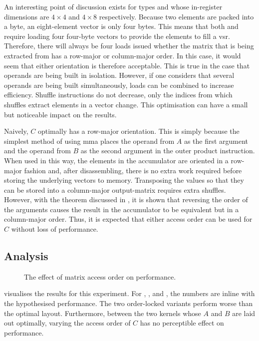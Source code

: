 \documentclass[\main/thesis.tex]{subfiles}
\begin{document}
An interesting point of discussion exists for types  and  whose in-register dimensions are $4 \times 4$ and $4 \times 8$ respectively.
Because two  elements are packed into a byte, an eight-element vector is only four bytes.
This means that both  and  require loading four four-byte vectors to provide the elements to fill a \gls{vsr}.
Therefore, there will always be four loads issued whether the matrix that is being extracted from has a row-major or column-major order.
In this case, it would seem that either orientation is therefore acceptable.
This is true in the case that operands are being built in isolation.
However, if one considers that several operands are being built simultaneously, loads can be combined to increase efficiency.
Shuffle instructions do not decrease, only the indices from which shuffles extract elements in a vector change.
This optimisation can have a small but noticeable impact on the results.

Naively, $C$ optimally has a row-major orientation.
This is simply because the simplest method of using \gls{mma} places the operand from $A$ as the first argument and the operand from $B$ as the second argument in the outer product instruction.
When used in this way, the elements in the accumulator are oriented in a row-major fashion and, after disassembling, there is no extra work required before storing the underlying vectors to memory.
Transposing the values so that they can be stored into a column-major output-matrix requires extra shuffles.
However, with the theorem discussed in , it is shown that reversing the order of the arguments causes the result in the accumulator to be equivalent but in a column-major order.
Thus, it is expected that either access order can be used for $C$ without loss of performance.

\subsection{Analysis}
\begin{figure}[t]
  \centering
  
  \caption{The effect of matrix access order on performance.}
  \label{fig:accessOrder}
\end{figure}

 visualises the results for this experiment.
For , , and , the numbers are inline with the hypothesised performance.
The two order-locked variants perform worse than the optimal layout.
Furthermore, between the two kernels whose $A$ and $B$ are laid out optimally, varying the access order of $C$ has no perceptible effect on performance.
\end{document}
